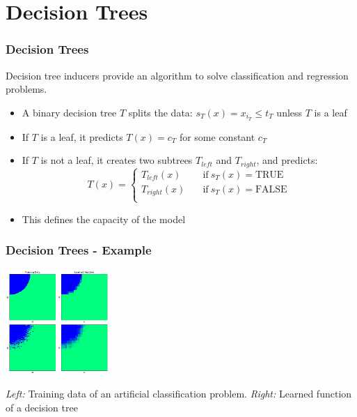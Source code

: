 \section{Decision Trees}
\begin{frame}
   \frametitle{Decision Trees}
   Decision tree inducers provide an algorithm to solve classification and regression problems.
   \begin{itemize}
      \item  A binary decision tree $T$ splits the data: $s_T(x) = x_{i_T} \leq t_{T}$ unless $T$ is a leaf
      \item If $T$ is a leaf, it predicts $T(x) = c_T$ for some constant $c_T$
      \item If $T$ is not a leaf, it creates two subtrees $T_{left}$ and $T_{right}$, and predicts:
      \[   
      T(x) = 
            \begin{cases}

               T_{left}(x) &\quad\text{if}\:  s_T(x) = \text{TRUE} \\
               T_{right}(x) &\quad\text{if}\:  s_T(x) = \text{FALSE} \\
            \end{cases}
      \]
      \item This defines the capacity of the model
   \end{itemize}
\end{frame}


\begin{frame}
   \frametitle{Decision Trees - Example}
   \begin{center}
      \includegraphics[height=150px]{img/true_vs_learned_regulartree.png}
   \end{center}
   \textit{Left:} Training data of an artificial classification problem. 
   \textit{Right:} Learned function of a decision tree
\end{frame}


